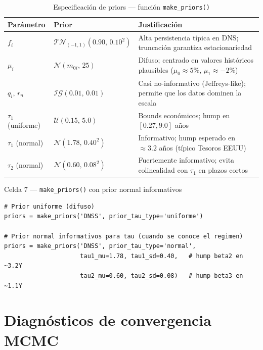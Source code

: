 \documentclass[12pt, a4paper]{article}
\theoremstyle{plain}
\theoremstyle{definition}
\theoremstyle{remark}
\newcommand{\IG}{\mathcal{IG}}
\newcommand{\N}{\mathcal{N}}
\newcommand{\TN}{\mathcal{TN}}
\begin{document}
\begin{table}[H]
\centering
\caption{Especificación de priors — función \texttt{make\_priors()}}
\label{tab:priors}
\small
\begin{tabular}{L{3cm} L{3.8cm} L{7cm}}
\toprule
\textbf{Parámetro} & \textbf{Prior} & \textbf{Justificación} \\
\midrule
$f_i$ & $\TN_{(-1,1)}(0.90,\,0.10^2)$ &
  Alta persistencia típica en DNS; truncación garantiza estacionariedad \\
\addlinespace
$\mu_i$ & $\N(m_{0i},\,25)$ &
  Difuso; centrado en valores históricos plausibles ($\mu_0 \approx 5\%$, $\mu_1 \approx -2\%$) \\
\addlinespace
$q_i,\,r_n$ & $\IG(0.01,\,0.01)$ &
  Casi no-informativo (Jeffreys-like); permite que los datos dominen la escala \\
\addlinespace
$\tau_1$ (uniforme) & $\mathcal{U}(0.15,\,5.0)$ &
  Bounds económicos; hump en $[0.27, 9.0]$ años \\
\addlinespace
$\tau_1$ (normal) & $\N(1.78,\,0.40^2)$ &
  Informativo; hump esperado en $\approx 3.2$ años (típico Tesoros EEUU) \\
\addlinespace
$\tau_2$ (normal) & $\N(0.60,\,0.08^2)$ &
  Fuertemente informativo; evita colinealidad con $\tau_1$ en plazos cortos \\
\bottomrule
\end{tabular}
\end{table}

\begin{codigocaja}{Celda 7 — \texttt{make\_priors()} con prior normal informativos}
\begin{lstlisting}
# Prior uniforme (difuso)
priors = make_priors('DNSS', prior_tau_type='uniforme')

# Prior normal informativos para tau (cuando se conoce el regimen)
priors = make_priors('DNSS', prior_tau_type='normal',
                     tau1_mu=1.78, tau1_sd=0.40,   # hump beta2 en ~3.2Y
                     tau2_mu=0.60, tau2_sd=0.08)   # hump beta3 en ~1.1Y
\end{lstlisting}
\end{codigocaja}

\section{Diagnósticos de convergencia MCMC}
\end{document}
